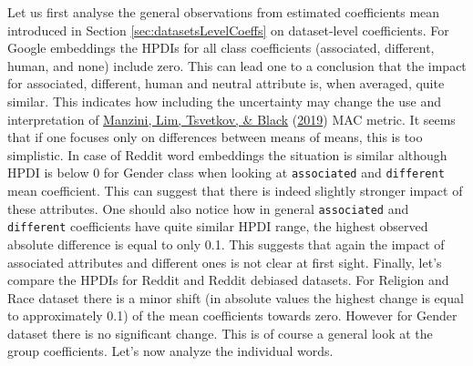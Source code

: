 \documentclass[
  12pt,
]{book}
\begin{document}
\vspace{1mm}
\footnotesize
\begin{table}

\caption{\label{tab:dTabRD}Overview statistics  (Reddit embedding, debiased)}
\centering
{}
\end{table}
\normalsize

Let us first analyse the general observations from estimated coefficients mean introduced in Section \ref{sec:datasetsLevelCoeffs} on dataset-level coefficients. For Google embeddings the HPDIs for all class coefficients (associated, different, human, and none) include zero. This can lead one to a conclusion that the impact for associated, different, human and neutral attribute is, when averaged, quite similar. This indicates how including the uncertainty may change the use and interpretation of \protect\hyperlink{ref-Manzini2019blackToCriminal}{Manzini, Lim, Tsvetkov, \& Black} (\protect\hyperlink{ref-Manzini2019blackToCriminal}{2019}) MAC metric. It seems that if one focuses only on differences between means of means, this is too simplistic. In case of Reddit word embeddings the situation is similar although HPDI is below 0 for Gender class when looking at \texttt{associated} and \texttt{different} mean coefficient. This can suggest that there is indeed slightly stronger impact of these attributes. One should also notice how in general \texttt{associated} and \texttt{different} coefficients have quite similar HPDI range, the highest observed absolute difference is equal to only 0.1. This suggests that again the impact of associated attributes and different ones is not clear at first sight. Finally, let's compare the HPDIs for Reddit and Reddit debiased datasets. For Religion and Race dataset there is a minor shift (in absolute values the highest change is equal to approximately 0.1) of the mean coefficients towards zero. However for Gender dataset there is no significant change. This is of course a general look at the group coefficients. Let's now analyze the individual words.
\end{document}
